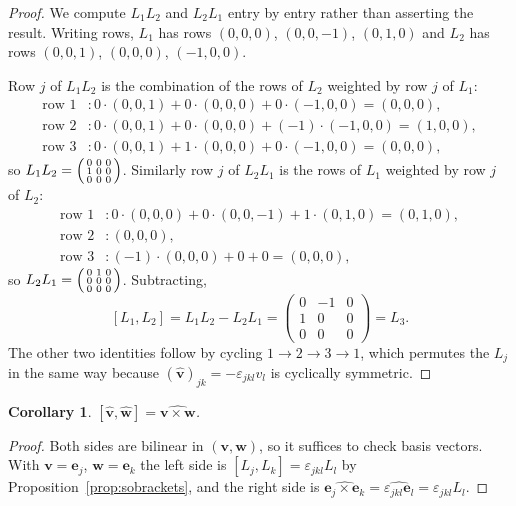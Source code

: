 \documentclass[11pt]{article}
\newcommand{\vv}[1]{\bm{#1}}
\newcommand{\hatmap}[1]{\widehat{#1}}
\theoremstyle{plain}
\newtheorem{corollary}[theorem]{Corollary}
\theoremstyle{definition}
\begin{document}
\begin{proof}
We compute $L_1L_2$ and $L_2L_1$ entry by entry rather than asserting the result. Writing rows,
$L_1$ has rows $(0,0,0)$, $(0,0,-1)$, $(0,1,0)$ and $L_2$ has rows $(0,0,1)$, $(0,0,0)$,
$(-1,0,0)$.

Row $j$ of $L_1L_2$ is the combination of the rows of $L_2$ weighted by row $j$ of $L_1$:
\begin{align*}
\text{row }1&: 0\cdot(0,0,1)+0\cdot(0,0,0)+0\cdot(-1,0,0)=(0,0,0),\\
\text{row }2&: 0\cdot(0,0,1)+0\cdot(0,0,0)+(-1)\cdot(-1,0,0)=(1,0,0),\\
\text{row }3&: 0\cdot(0,0,1)+1\cdot(0,0,0)+0\cdot(-1,0,0)=(0,0,0),
\end{align*}
so $L_1L_2=\begin{psmallmatrix}0&0&0\\1&0&0\\0&0&0\end{psmallmatrix}$. Similarly row $j$ of
$L_2L_1$ is the rows of $L_1$ weighted by row $j$ of $L_2$:
\begin{align*}
\text{row }1&: 0\cdot(0,0,0)+0\cdot(0,0,-1)+1\cdot(0,1,0)=(0,1,0),\\
\text{row }2&: (0,0,0),\\
\text{row }3&: (-1)\cdot(0,0,0)+0+0=(0,0,0),
\end{align*}
so $L_2L_1=\begin{psmallmatrix}0&1&0\\0&0&0\\0&0&0\end{psmallmatrix}$. Subtracting,
\[
[L_1,L_2]=L_1L_2-L_2L_1=\begin{pmatrix}0&-1&0\\1&0&0\\0&0&0\end{pmatrix}=L_3 .
\]
The other two identities follow by cycling $1\to2\to3\to1$, which permutes the $L_j$ in the same
way because $(\hatmap{\vv v})_{jk}=-\varepsilon_{jkl}v_l$ is cyclically symmetric.
\end{proof}

\begin{corollary}\label{cor:hatbracket}
$[\hatmap{\vv v},\hatmap{\vv w}]=\widehat{\vv v\times\vv w}$.
\end{corollary}

\begin{proof}
Both sides are bilinear in $(\vv v,\vv w)$, so it suffices to check basis vectors. With
$\vv v=\vv e_j$, $\vv w=\vv e_k$ the left side is $[L_j,L_k]=\varepsilon_{jkl}L_l$ by
Proposition~\ref{prop:sobrackets}, and the right side is
$\widehat{\vv e_j\times\vv e_k}=\widehat{\varepsilon_{jkl}\vv e_l}=\varepsilon_{jkl}L_l$.
\end{proof}
\end{document}
